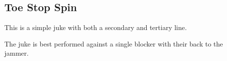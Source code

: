 \subsection*{Toe Stop Spin}

This is a simple juke with both a secondary and tertiary line. 

The juke is best performed against a single blocker with their back to the jammer.



